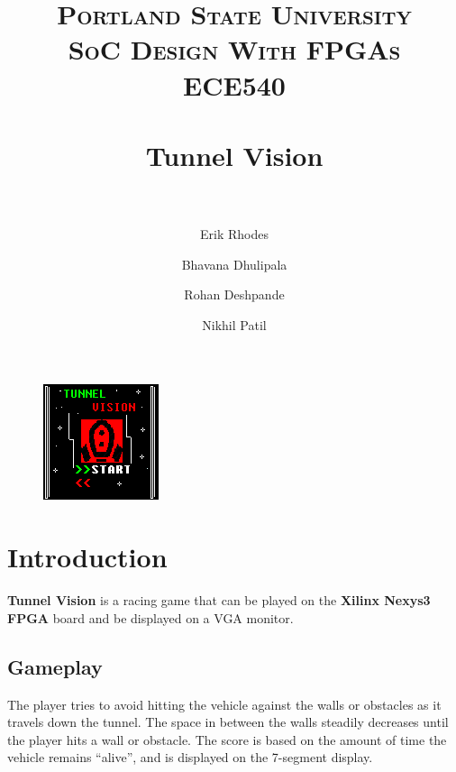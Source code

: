 \documentclass[11pt]{article}
\title{	
\normalfont \normalsize 
\textsc{\LARGE Portland State University}\\[1.5cm] %
\textsc{\Large SoC Design With FPGAs}\\[0.5cm] %
\textsc{\large ECE540}\\[0.5cm] %
\horrule{1.2pt} \\[0.4cm] %
\huge Tunnel Vision \\ %
\horrule{1.2pt} \\[0.5cm] %
}
\begin{document}
\raggedright
\author{Erik Rhodes \and Bhavana Dhulipala \and Rohan Deshpande \and Nikhil Patil} %
\maketitle %
\thispagestyle{empty}


\begin{figure}[h]\centering
\includegraphics[height=0.65\textwidth]{Images/start.png}
		\label{start}
	\end{figure}

\tableofcontents
\newpage


\section{Introduction} 
\textbf{Tunnel Vision} is a racing game that can be played on the \textbf{Xilinx Nexys3 FPGA} board and be displayed on a VGA monitor.

\subsection{Gameplay}
The player tries to avoid hitting the vehicle against the walls or obstacles as it travels down the tunnel. The space in between the walls steadily decreases until the player hits a wall or obstacle. The score is based on the amount of time the vehicle remains ``alive'', and is displayed on the 7-segment display.
\end{document}
